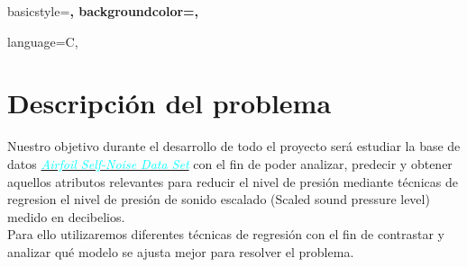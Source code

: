  


   {basicstyle=\scriptsize\bf\ttfamily,
    backgroundcolor=\color{gray75},
   }
 
   {language=C,
   }





\maketitle %

\newpage %

\tableofcontents %

\listoffigures


\newpage




\section{Descripción del problema}
Nuestro objetivo durante el desarrollo de todo el proyecto será estudiar la base de datos \href{https://archive.ics.uci.edu/ml/datasets/Airfoil+Self-Noise}{\textcolor{cyan}{\emph{Airfoil Self-Noise Data Set}}} con el fin de poder analizar, predecir y obtener aquellos atributos relevantes para reducir el nivel de presión mediante técnicas de regresion el nivel de presión de sonido escalado (Scaled sound pressure level) medido en decibelios.\\

Para ello utilizaremos diferentes técnicas de regresión con el fin de contrastar y analizar qué modelo se ajusta mejor para resolver el problema.\\

